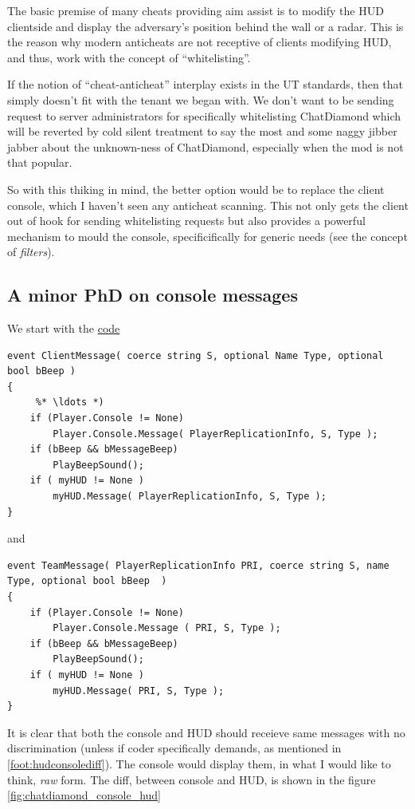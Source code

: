 \documentclass{article}
\begin{document}
The basic premise of many cheats providing aim assist is to modify the HUD clientside and display the adversary's position behind the wall or a radar.  This is the reason why modern anticheats are not receptive of clients modifying HUD, and thus, work with the concept of ``whitelisting''.

If the notion of ``cheat-anticheat'' interplay exists in the UT standards, then that simply doesn't fit with the tenant we began with.  We don't want to be sending request to server administrators for specifically whitelisting ChatDiamond which will be reverted by cold silent treatment to say the most and some naggy jibber jabber about the unknown-ness of ChatDiamond, especially when the mod is not that popular.

So with this thiking in mind, the better option would be to replace the client console, which I haven't seen any anticheat scanning. This not only gets the client out of hook for sending whitelisting requests but also provides a powerful mechanism to mould the console, specificifically for generic needs (see the concept of \emph{filters}).

\subsection{A minor PhD on console messages}

We start with the \href{http://uncodex.ut-files.com/UT/v436/Source_engine/playerpawn.html}{code} 

\begin{lstlisting}[frame=single]
event ClientMessage( coerce string S, optional Name Type, optional bool bBeep )
{
     %* \ldots *)    
    if (Player.Console != None)
        Player.Console.Message( PlayerReplicationInfo, S, Type );
    if (bBeep && bMessageBeep)
        PlayBeepSound();
    if ( myHUD != None )
        myHUD.Message( PlayerReplicationInfo, S, Type );
}       
\end{lstlisting}
and
\begin{lstlisting}[frame=single]
event TeamMessage( PlayerReplicationInfo PRI, coerce string S, name Type, optional bool bBeep  )
{
    if (Player.Console != None)
        Player.Console.Message ( PRI, S, Type );
    if (bBeep && bMessageBeep)
        PlayBeepSound();
    if ( myHUD != None )
        myHUD.Message( PRI, S, Type );
}     
\end{lstlisting}

It is clear that both the console and HUD should receieve same messages with no discrimination (unless if coder specifically demands, as mentioned in \ref{foot:hudconsolediff}).  The console would display them, in what I would like to think, \emph{raw} form.  The diff, between console and HUD, is shown in the figure \ref{fig:chatdiamond_console_hud}
\end{document}
